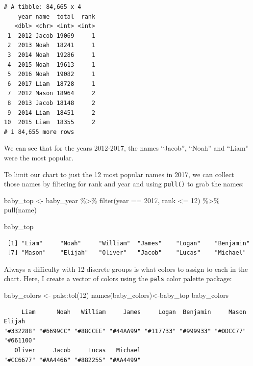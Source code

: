 \documentclass[
  letterpaper,
  DIV=11,
  numbers=noendperiod]{scrreprt}
\newenvironment{Shaded}{\begin{snugshade}}{\end{snugshade}}
\newcommand{\DecValTok}[1]{\textcolor[rgb]{0.68,0.00,0.00}{#1}}
\newcommand{\FunctionTok}[1]{\textcolor[rgb]{0.28,0.35,0.67}{#1}}
\newcommand{\NormalTok}[1]{\textcolor[rgb]{0.00,0.23,0.31}{#1}}
\newcommand{\OtherTok}[1]{\textcolor[rgb]{0.00,0.23,0.31}{#1}}
\newcommand{\SpecialCharTok}[1]{\textcolor[rgb]{0.37,0.37,0.37}{#1}}
\begin{document}
\begin{verbatim}
# A tibble: 84,665 x 4
    year name  total  rank
   <dbl> <chr> <int> <int>
 1  2012 Jacob 19069     1
 2  2013 Noah  18241     1
 3  2014 Noah  19286     1
 4  2015 Noah  19613     1
 5  2016 Noah  19082     1
 6  2017 Liam  18728     1
 7  2012 Mason 18964     2
 8  2013 Jacob 18148     2
 9  2014 Liam  18451     2
10  2015 Liam  18355     2
# i 84,655 more rows
\end{verbatim}

We can see that for the years 2012-2017, the names ``Jacob'', ``Noah''
and ``Liam'' were the most popular.

To limit our chart to just the 12 most popular names in 2017, we can
collect those names by filtering for rank and year and using
\texttt{pull()} to grab the names:

\begin{Shaded}
\begin{Highlighting}[]
\NormalTok{baby\_top }\OtherTok{\textless{}{-}}\NormalTok{ baby\_year }\SpecialCharTok{\%\textgreater{}\%}
  \FunctionTok{filter}\NormalTok{(year }\SpecialCharTok{==} \DecValTok{2017}\NormalTok{, rank }\SpecialCharTok{\textless{}=} \DecValTok{12}\NormalTok{) }\SpecialCharTok{\%\textgreater{}\%}
  \FunctionTok{pull}\NormalTok{(name)}

\NormalTok{baby\_top}
\end{Highlighting}
\end{Shaded}

\begin{verbatim}
 [1] "Liam"     "Noah"     "William"  "James"    "Logan"    "Benjamin"
 [7] "Mason"    "Elijah"   "Oliver"   "Jacob"    "Lucas"    "Michael" 
\end{verbatim}

Always a difficulty with 12 discrete groups is what colors to assign to
each in the chart. Here, I create a vector of colors using the
\texttt{pals} color palette package:

\begin{Shaded}
\begin{Highlighting}[]
\NormalTok{baby\_colors }\OtherTok{\textless{}{-}}\NormalTok{ pals}\SpecialCharTok{::}\FunctionTok{tol}\NormalTok{(}\DecValTok{12}\NormalTok{)}
\FunctionTok{names}\NormalTok{(baby\_colors)}\OtherTok{\textless{}{-}}\NormalTok{baby\_top}
\NormalTok{baby\_colors}
\end{Highlighting}
\end{Shaded}

\begin{verbatim}
     Liam      Noah   William     James     Logan  Benjamin     Mason    Elijah 
"#332288" "#6699CC" "#88CCEE" "#44AA99" "#117733" "#999933" "#DDCC77" "#661100" 
   Oliver     Jacob     Lucas   Michael 
"#CC6677" "#AA4466" "#882255" "#AA4499" 
\end{verbatim}
\end{document}
